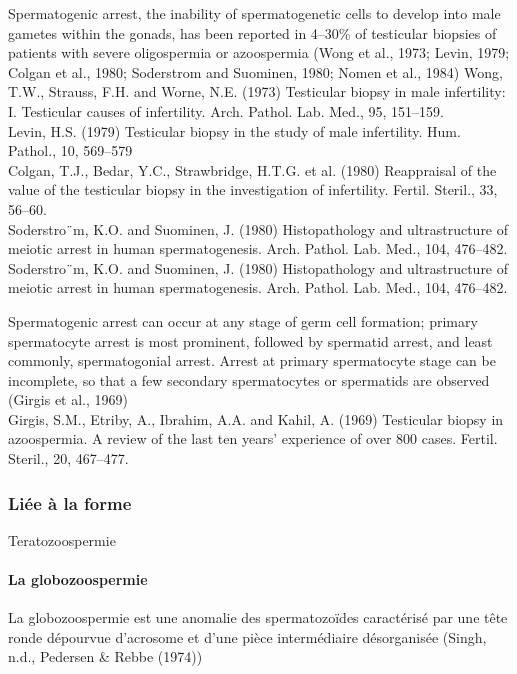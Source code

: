 \documentclass[12pt,twoside]{reedthesis}
\theoremstyle{definition}
\theoremstyle{definition}
\theoremstyle{remark}
\begin{document}
  Spermatogenic arrest, the inability of spermatogenetic cells to develop
  into male gametes within the gonads, has been reported in 4--30\% of
  testicular biopsies of patients with severe oligospermia or azoospermia
  (Wong et al., 1973; Levin, 1979; Colgan et al., 1980; Soderstrom and
  Suominen, 1980; Nomen et al., 1984) Wong, T.W., Strauss, F.H. and Worne,
  N.E. (1973) Testicular biopsy in male infertility: I. Testicular causes
  of infertility. Arch. Pathol. Lab. Med., 95, 151--159.\\
  Levin, H.S. (1979) Testicular biopsy in the study of male infertility.
  Hum. Pathol., 10, 569--579\\
  Colgan, T.J., Bedar, Y.C., Strawbridge, H.T.G. et al. (1980) Reappraisal
  of the value of the testicular biopsy in the investigation of
  infertility. Fertil. Steril., 33, 56--60.\\
  Soderstro¨m, K.O. and Suominen, J. (1980) Histopathology and
  ultrastructure of meiotic arrest in human spermatogenesis. Arch. Pathol.
  Lab. Med., 104, 476--482.\\
  Soderstro¨m, K.O. and Suominen, J. (1980) Histopathology and
  ultrastructure of meiotic arrest in human spermatogenesis. Arch. Pathol.
  Lab. Med., 104, 476--482.
  
  Spermatogenic arrest can occur at any stage of germ cell formation;
  primary spermatocyte arrest is most prominent, followed by spermatid
  arrest, and least commonly, spermatogonial arrest. Arrest at primary
  spermatocyte stage can be incomplete, so that a few secondary
  spermatocytes or spermatids are observed (Girgis et al., 1969)\\
  Girgis, S.M., Etriby, A., Ibrahim, A.A. and Kahil, A. (1969) Testicular
  biopsy in azoospermia. A review of the last ten years' experience of
  over 800 cases. Fertil. Steril., 20, 467--477.
  
  \subsubsection{Liée à la forme}\label{liee-a-la-forme}
  
  Teratozoospermie
  
  \paragraph{La globozoospermie}\label{la-globozoospermie}
  
  La globozoospermie est une anomalie des spermatozoïdes caractérisé par
  une tête ronde dépourvue d'acrosome et d'une pièce intermédiaire
  désorganisée (Singh, n.d., Pedersen \& Rebbe (1974))
  
\end{document}
